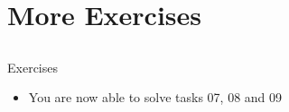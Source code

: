 \section{More Exercises}
\subsection{}
\begin{frame}{Exercises}
	\begin{itemize}
		\item You are now able to solve tasks 07, 08 and 09
	\end{itemize}
\end{frame}


